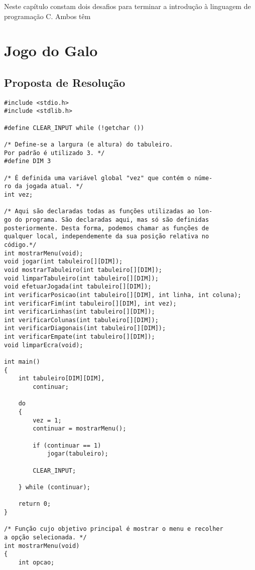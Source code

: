 
Neste capítulo constam dois desafios para terminar a introdução à linguagem de programação C. Ambos têm 

\section{Jogo do Galo}

\subsection{Proposta de Resolução}

\begin{lstlisting}
#include <stdio.h>
#include <stdlib.h>

#define CLEAR_INPUT while (!getchar ())

/* Define-se a largura (e altura) do tabuleiro. 
Por padrão é utilizado 3. */
#define DIM 3

/* É definida uma variável global "vez" que contém o núme-
ro da jogada atual. */
int vez;

/* Aqui são declaradas todas as funções utilizadas ao lon-
go do programa. São declaradas aqui, mas só são definidas
posteriormente. Desta forma, podemos chamar as funções de
qualquer local, independemente da sua posição relativa no
código.*/
int mostrarMenu(void);
void jogar(int tabuleiro[][DIM]);
void mostrarTabuleiro(int tabuleiro[][DIM]);
void limparTabuleiro(int tabuleiro[][DIM]);
void efetuarJogada(int tabuleiro[][DIM]);
int verificarPosicao(int tabuleiro[][DIM], int linha, int coluna);
int verificarFim(int tabuleiro[][DIM], int vez);
int verificarLinhas(int tabuleiro[][DIM]);
int verificarColunas(int tabuleiro[][DIM]);
int verificarDiagonais(int tabuleiro[][DIM]);
int verificarEmpate(int tabuleiro[][DIM]);
void limparEcra(void);

int main()
{
	int tabuleiro[DIM][DIM],
		continuar;

	do
	{
		vez = 1;
		continuar = mostrarMenu();

		if (continuar == 1)
			jogar(tabuleiro);

		CLEAR_INPUT;

	} while (continuar);

	return 0;
}

/* Função cujo objetivo principal é mostrar o menu e recolher
a opção selecionada. */
int mostrarMenu(void)
{
	int opcao;


\end{lstlisting}
